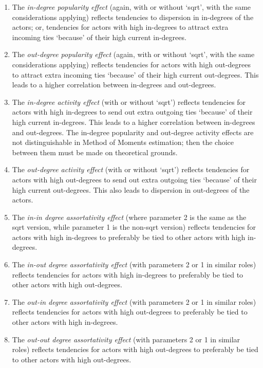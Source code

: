 \documentclass[a4paper,fleqn]{article}
\newcommand{\+}{\, + \,}
\begin{document}
{\begin{enumerate}
\item The \emph{in-degree popularity effect} (again, with or without `sqrt',
     with the same considerations applying)
     reflects tendencies to dispersion in in-degrees of the actors;
     or, tendencies for actors with high in-degrees to attract extra incoming ties
     `because' of their high current in-degrees.
\item The \emph{out-degree popularity effect} (again, with or without `sqrt',
     with the same considerations applying)
     reflects tendencies for
     actors with high out-degrees to attract extra incoming ties
     `because' of their high current out-degrees.
     This leads to a higher correlation between in-degrees and out-degrees.
\item The \emph{in-degree activity effect} (with or without `sqrt')
     reflects tendencies for
     actors with high in-degrees to send out extra outgoing ties
     `because' of their high current in-degrees.
     This leads to a higher correlation between in-degrees and out-degrees.
     The in-degree popularity and out-degree activity effects are
     not distinguishable in Method of Moments estimation; then the choice between them
     must be made on theoretical grounds.
\item The \emph{out-degree activity effect} (with or without `sqrt')
     reflects tendencies for
     actors with high out-degrees to send out extra outgoing ties
     `because' of their high current out-degrees.
     This also leads to dispersion in out-degrees of the actors.
\item The \emph{in-in degree assortativity effect} (where parameter 2 is the same
    as the sqrt version, while parameter 1 is the non-sqrt version)
     reflects tendencies for actors with high in-degrees
     to preferably be tied to other actors with high in-degrees.
\item The \emph{in-out degree assortativity effect} (with parameters
     2 or 1 in similar roles)
     reflects tendencies for actors with high in-degrees
     to preferably be tied to other actors with high out-degrees.
\item The \emph{out-in degree assortativity effect} (with parameters
     2 or 1 in similar roles)
     reflects tendencies for actors with high out-degrees
     to preferably be tied to other actors with high in-degrees.
\item The \emph{out-out degree assortativity effect} (with parameters
     2 or 1 in similar roles)
     reflects tendencies for actors with high out-degrees
     to preferably be tied to other actors with high out-degrees.
\end{enumerate}

}
\end{document}
